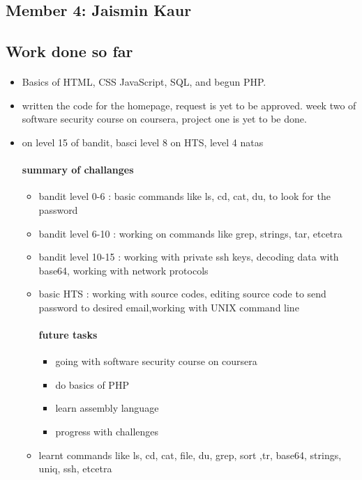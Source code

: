 \documentclass{article}
\begin{document}
\begin{itemize}
\newpage
\section*{Member 4: Jaismin Kaur}
\subsection*{Work done so far}
\paragraph{}
\begin{itemize}
    \item Basics of HTML, CSS JavaScript, SQL, and begun PHP.
    \item written the code for the homepage, request is yet to be approved.
    \itemon week two of software security course on coursera, project one is yet to be done.
    \item on level 15 of bandit, basci level 8 on HTS, level 4 natas
\paragraph{summary of challanges} 
\begin{itemize}
    \item bandit level 0-6 : basic commands like ls, cd, cat, du, to look for the password
    \item bandit level 6-10 : working on commands like grep, strings, tar, etcetra
    \item bandit level 10-15 : working with private ssh keys, decoding data with base64, working with network protocols
    \item basic HTS : working with source codes, editing source code to send password to desired email,working with UNIX command line
\paragraph{future tasks}
\begin{itemize}
    \item going with software security course on coursera
    \item do basics of PHP
    \item learn assembly language
    \item progress with challenges
\end{itemize}
\end{itemize}
\begin{itemize}
    \item learnt commands like ls, cd, cat, file, du, grep, sort ,tr, base64, strings, uniq, ssh, etcetra
\end{itemize}
    
\end{itemize}
\end{itemize}
\newpage
\end{document}
